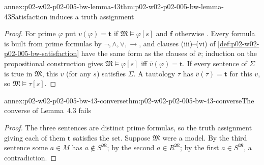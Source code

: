 \begin{annexitem}{annex:p02-w02-p02-005-bw-lemma-43}{thm:p02-w02-p02-005-bw-lemma-43}{Satisfaction induces a truth assignment}
\begin{proof}
For prime \(\varphi\) put \(v(\varphi)=\mathbf t\) if
\(\mathfrak M\models\varphi[s]\) and \(\mathbf f\) otherwise
\cite[ch.~A.1, \S4, p.~29]{Barwise1977FirstOrder}.  Every formula is built
from prime formulas by \(\neg,\land,\lor,\to\), and clauses (iii)--(vi) of
\cref{def:p02-w02-p02-005-bw-satisfaction} have the same form as the
clauses of \(\bar v\); induction on the propositional construction gives
\(\mathfrak M\models\varphi[s]\) iff \(\bar v(\varphi)=\mathbf t\).  If every
sentence of \(\Sigma\) is true in \(\mathfrak M\), this \(v\) (for any
\(s\)) satisfies \(\Sigma\).  A tautology \(\tau\) has
\(\bar v(\tau)=\mathbf t\) for this \(v\), so \(\mathfrak M\models\tau[s]\).
\end{proof}
\end{annexitem}

\begin{annexitem}{annex:p02-w02-p02-005-bw-43-converse}{thm:p02-w02-p02-005-bw-43-converse}{The converse of Lemma~4.3 fails}
\begin{proof}
The three sentences are distinct prime formulas, so the truth assignment
giving each of them \(\mathbf t\) satisfies the set.  Suppose
\(\mathfrak M\) were a model.  By the third sentence some \(a\in M\) has
\(a\notin S^{\mathfrak M}\); by the second \(a\in R^{\mathfrak M}\); by
the first \(a\in S^{\mathfrak M}\), a contradiction.
\end{proof}
\end{annexitem}

